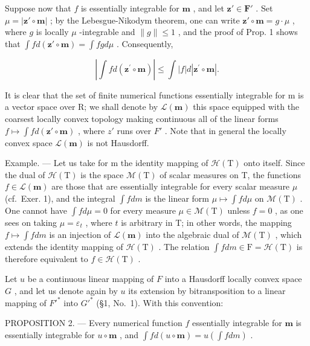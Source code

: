 Suppose now that \(f\) is essentially integrable for \(\mathbf{m}\) , and let \(\mathbf{z}' \in \mathbf{F}'\) . Set \(\mu = |\mathbf{z}' \circ \mathbf{m}|\) ; by the Lebesgue-Nikodym theorem, one can write \(\mathbf{z}' \circ \mathbf{m} = g \cdot \mu\) , where \(g\) is locally \(\mu\) -integrable and \(\| g \| \leqslant 1\) , and the proof of Prop. 1 shows that \(\int f d(\mathbf{z}' \circ \mathbf{m}) = \int fg d\mu\) . Consequently,

\[
\left| \int f d (\mathbf {z} ^ {\prime} \circ \mathbf {m}) \right| \leqslant \int | f | d | \mathbf {z} ^ {\prime} \circ \mathbf {m} |.\tag{2}
\]

It is clear that the set of finite numerical functions essentially integrable for m is a vector space over R; we shall denote by \(\mathcal{L}(\mathbf{m})\) this space equipped with the coarsest locally convex topology making continuous all of the linear forms \(f \mapsto \int f d(\mathbf{z}' \circ \mathbf{m})\) , where \(z'\) runs over \(F'\) . Note that in general the locally convex space \(\mathcal{L}(\mathbf{m})\) is not Hausdorff.

Example. --- Let us take for m the identity mapping of \(\mathcal{H}(\mathrm{T})\) onto itself. Since the dual of \(\mathcal{H}(\mathrm{T})\) is the space \(\mathcal{M}(\mathrm{T})\) of scalar measures on T, the functions \(f \in \mathcal{L}(\mathbf{m})\) are those that are essentially integrable for every scalar measure \(\mu\) (cf.~Exer. 1), and the integral \(\int f dm\) is the linear form \(\mu \mapsto \int f d\mu\) on \(\mathcal{M}(\mathrm{T})\) . One cannot have \(\int f d\mu = 0\) for every measure \(\mu \in \mathcal{M}(\mathrm{T})\) unless \(f = 0\) , as one sees on taking \(\mu = \varepsilon_t\) , where \(t\) is arbitrary in T; in other words, the mapping \(f \mapsto \int f dm\) is an injection of \(\mathcal{L}(\mathbf{m})\) into the algebraic dual of \(\mathcal{M}(\mathrm{T})\) , which extends the identity mapping of \(\mathcal{H}(\mathrm{T})\) . The relation \(\int f dm \in \mathrm{F} = \mathcal{H}(\mathrm{T})\) is therefore equivalent to \(f \in \mathcal{H}(\mathrm{T})\) .

Let \(u\) be a continuous linear mapping of \(F\) into a Hausdorff locally convex space \(G\) , and let us denote again by \(u\) its extension by bitransposition to a linear mapping of \(F'^*\) into \(G'^*\) (§1, No.~1). With this convention:

PROPOSITION 2. --- Every numerical function \(f\) essentially integrable for \(\mathbf{m}\) is essentially integrable for \(u \circ \mathbf{m}\) , and \(\int f d(u \circ \mathbf{m}) = u\left(\int f dm\right)\) .

